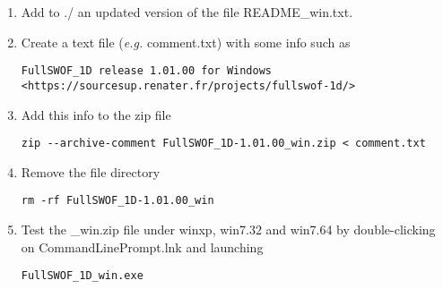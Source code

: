 \documentclass[a4paper, 11pt]{article}
\begin{document}
\begin{enumerate}
\begin{itemize}
	\end{itemize}
\item Add to ./ an updated version of the file README\_win.txt.
\item Create a text file (\emph{e.g.} comment.txt) with some info such as
\begin{verbatim}
FullSWOF_1D release 1.01.00 for Windows
<https://sourcesup.renater.fr/projects/fullswof-1d/>
\end{verbatim}
\item Add this info to the zip file
\begin{verbatim}
zip --archive-comment FullSWOF_1D-1.01.00_win.zip < comment.txt
\end{verbatim}
\item Remove the file directory
\begin{verbatim}
rm -rf FullSWOF_1D-1.01.00_win
\end{verbatim}

\item Test the \_win.zip file under winxp, win7.32 and win7.64 by
double-clicking on CommandLinePrompt.lnk and launching
\begin{verbatim}
FullSWOF_1D_win.exe
\end{verbatim}
\end{enumerate}
\end{document}
